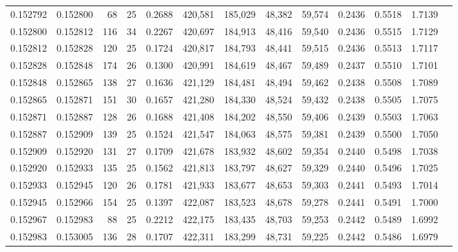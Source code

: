 \begin{tabular}{rrrrrrrrrrrrr}
0.152792 & 0.152800 &  68 &  25 &                                     0.2688 & 420,581 & 185,029 &  48,382 &  59,574 & 0.2436 & 0.5518 & 1.7139 \\
0.152800 & 0.152812 & 116 &  34 &                                     0.2267 & 420,697 & 184,913 &  48,416 &  59,540 & 0.2436 & 0.5515 & 1.7129 \\
0.152812 & 0.152828 & 120 &  25 &                                     0.1724 & 420,817 & 184,793 &  48,441 &  59,515 & 0.2436 & 0.5513 & 1.7117 \\
0.152828 & 0.152848 & 174 &  26 &                                     0.1300 & 420,991 & 184,619 &  48,467 &  59,489 & 0.2437 & 0.5510 & 1.7101 \\
0.152848 & 0.152865 & 138 &  27 &                                     0.1636 & 421,129 & 184,481 &  48,494 &  59,462 & 0.2438 & 0.5508 & 1.7089 \\
0.152865 & 0.152871 & 151 &  30 &                                     0.1657 & 421,280 & 184,330 &  48,524 &  59,432 & 0.2438 & 0.5505 & 1.7075 \\
0.152871 & 0.152887 & 128 &  26 &                                     0.1688 & 421,408 & 184,202 &  48,550 &  59,406 & 0.2439 & 0.5503 & 1.7063 \\
0.152887 & 0.152909 & 139 &  25 &                                     0.1524 & 421,547 & 184,063 &  48,575 &  59,381 & 0.2439 & 0.5500 & 1.7050 \\
0.152909 & 0.152920 & 131 &  27 &                                     0.1709 & 421,678 & 183,932 &  48,602 &  59,354 & 0.2440 & 0.5498 & 1.7038 \\
0.152920 & 0.152933 & 135 &  25 &                                     0.1562 & 421,813 & 183,797 &  48,627 &  59,329 & 0.2440 & 0.5496 & 1.7025 \\
0.152933 & 0.152945 & 120 &  26 &                                     0.1781 & 421,933 & 183,677 &  48,653 &  59,303 & 0.2441 & 0.5493 & 1.7014 \\
0.152945 & 0.152966 & 154 &  25 &                                     0.1397 & 422,087 & 183,523 &  48,678 &  59,278 & 0.2441 & 0.5491 & 1.7000 \\
0.152967 & 0.152983 &  88 &  25 &                                     0.2212 & 422,175 & 183,435 &  48,703 &  59,253 & 0.2442 & 0.5489 & 1.6992 \\
0.152983 & 0.153005 & 136 &  28 &                                     0.1707 & 422,311 & 183,299 &  48,731 &  59,225 & 0.2442 & 0.5486 & 1.6979 \\

\end{tabular}
